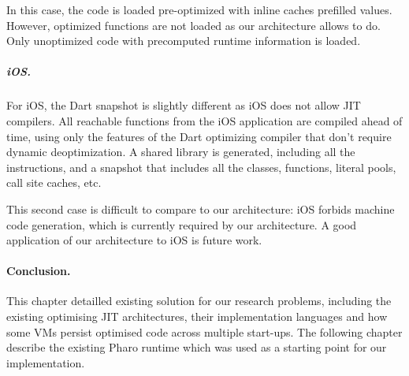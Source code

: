 \documentclass[a4paper,12pt,twoside]{../includes/ThesisStyle}
\begin{document}
In this case, the code is loaded pre-optimized with inline caches prefilled values. However, optimized functions are not loaded as our architecture allows to do. Only unoptimized code with precomputed runtime information is loaded.

\subparagraph{iOS.} For iOS, the Dart snapshot is slightly different as iOS does not allow JIT compilers. All reachable functions from the iOS application are compiled ahead of time, using only the features of the Dart optimizing compiler that don't require dynamic deoptimization. A shared library is generated, including all the instructions, and a snapshot that includes all the classes, functions, literal pools, call site caches, etc.

This second case is difficult to compare to our architecture: iOS forbids machine code generation, which is currently required by our architecture. A good application of our architecture to iOS is future work.








\paragraph{Conclusion.} This chapter detailled existing solution for our research problems, including the existing optimising JIT architectures, their implementation languages and how some VMs persist optimised code across multiple start-ups. The following chapter describe the existing Pharo runtime which was used as a starting point for our implementation.
\end{document}
